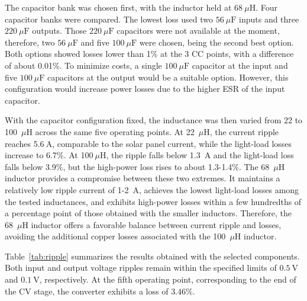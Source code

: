 \documentclass[conference]{IEEEtran}
\begin{document}
    The capacitor bank was chosen first, with the inductor held at $68~\mu\mathrm{H}$. Four capacitor banks were compared. The lowest loss used two $56~\mu\mathrm{F}$ inputs and three $220~\mu\mathrm{F}$ outputs. Those $220~\mu\mathrm{F}$ capacitors were not available at the moment, therefore, two $56~\mu\mathrm{F}$ and five $100~\mu\mathrm{F}$
    were chosen, being the second best option. Both options showed losses lower than 1\% at the 3 CC points, with a difference of about 0.01\%. To minimize costs, a single $100~\mu\mathrm{F}$ capacitor at the input and five $100~\mu\mathrm{F}$ capacitors at the output would be a suitable option. However, this configuration would increase power losses due to the higher ESR of the input capacitor.
    
    With the capacitor configuration fixed, the inductance was then varied from 22 to 100~$\mu\mathrm{H}$ across the same five operating points. At 22~$\mu\mathrm{H}$, the current ripple reaches 5.6$~\mathrm{A}$, comparable to the solar panel current, while the light-load losses increase to 6.7\%. At 100$~\mu\mathrm{H}$, the ripple falls below 1.3~$\mathrm{A}$ and the light-load loss falls below 3.9\%, but the high-power loss rises to about 1.3-1.4\%. The 68~$\mu\mathrm{H}$ inductor provides a compromise between these two extremes. It maintains a relatively low ripple current of 1-2~$\mathrm{A}$, achieves the lowest light-load losses among the tested inductances, and exhibits high-power losses within a few hundredths of a percentage point of those obtained with the smaller inductors. Therefore, the 68~$\mu\mathrm{H}$ inductor offers a favorable balance between current ripple and losses, avoiding the additional copper losses associated with the 100~$\mu\mathrm{H}$ inductor.


    Table~\ref{tab:ripple} summarizes the results obtained with the selected components. Both input and output voltage ripples remain within the specified limits of $0.5~\mathrm{V}$ and $0.1~\mathrm{V}$, respectively. At the fifth operating point, corresponding to the end of the CV stage, the converter exhibits a loss of $3.46\%$.
\end{document}
